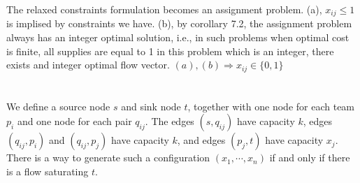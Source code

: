 \documentclass{article}
\newcommand{\1}{\bm 1}
\begin{document}
The relaxed constraints formulation becomes an assignment problem. 
(a), $x_{ij} \leq 1$ is implised by constraints we have.
(b), by corollary 7.2, the assignment problem always has an integer optimal solution, i.e., in such problems when optimal cost is finite, all supplies are equal to 1 in this problem which is an integer, there exists and integer optimal flow vector.
$(a), (b) \Rightarrow x_{ij} \in \{0, 1\}$ 

\section{}

We define a source node $s$ and sink node $t$, together with one node for each team $p_i$ and one node for each pair $q_{ij}$. The edges $(s,q_{ij})$ have capacity $k$, edges $(q_{ij},p_i)$ and $(q_{ij},p_j)$ have capacity $k$, and edges $(p_j,t)$ have capacity $x_j$. There is a way to generate such a configuration $(x_1, \cdots,x_n)$ if and only if there is a flow saturating $t$.
\end{document}
